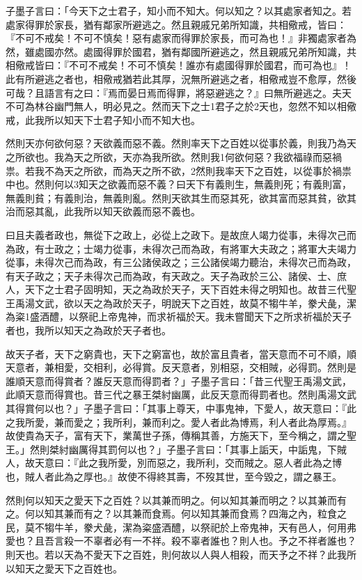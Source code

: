 
\begin{pinyinscope}
子墨子言曰：「今天下之士君子，知小而不知大。何以知之？以其處家者知之。若處家得罪於家長，猶有鄰家所避逃之。然且親戚兄弟所知識，共相儆戒，皆曰：『不可不戒矣！不可不慎矣！惡有處家而得罪於家長，而可為也！』非獨處家者為然，雖處國亦然。處國得罪於國君，猶有鄰國所避逃之，然且親戚兄弟所知識，共相儆戒皆曰：『不可不戒矣！不可不慎矣！誰亦有處國得罪於國君，而可為也』！此有所避逃之者也，相儆戒猶若此其厚，況無所避逃之者，相儆戒豈不愈厚，然後可哉？且語言有之曰：『焉而晏日焉而得罪，將惡避逃之？』曰無所避逃之。夫天不可為林谷幽門無人，明必見之。然而天下之士1君子之於2天也，忽然不知以相儆戒，此我所以知天下士君子知小而不知大也。

然則天亦何欲何惡？天欲義而惡不義。然則率天下之百姓以從事於義，則我乃為天之所欲也。我為天之所欲，天亦為我所欲。然則我1何欲何惡？我欲福祿而惡禍祟。若我不為天之所欲，而為天之所不欲，2然則我率天下之百姓，以從事於禍祟中也。然則何以3知天之欲義而惡不義？曰天下有義則生，無義則死；有義則富，無義則貧；有義則治，無義則亂。然則天欲其生而惡其死，欲其富而惡其貧，欲其治而惡其亂，此我所以知天欲義而惡不義也。

曰且夫義者政也，無從下之政上，必從上之政下。是故庶人竭力從事，未得次己而為政，有士政之；士竭力從事，未得次己而為政，有將軍大夫政之；將軍大夫竭力從事，未得次己而為政，有三公諸侯政之；三公諸侯竭力聽治，未得次己而為政，有天子政之；天子未得次己而為政，有天政之。天子為政於三公、諸侯、士、庶人，天下之士君子固明知，天之為政於天子，天下百姓未得之明知也。故昔三代聖王禹湯文武，欲以天之為政於天子，明說天下之百姓，故莫不犓牛羊，豢犬彘，潔為粢1盛酒醴，以祭祀上帝鬼神，而求祈福於天。我未嘗聞天下之所求祈福於天子者也，我所以知天之為政於天子者也。

故天子者，天下之窮貴也，天下之窮富也，故於富且貴者，當天意而不可不順，順天意者，兼相愛，交相利，必得賞。反天意者，別相惡，交相賊，必得罰。然則是誰順天意而得賞者？誰反天意而得罰者？」子墨子言曰：「昔三代聖王禹湯文武，此順天意而得賞也。昔三代之暴王桀紂幽厲，此反天意而得罰者也。然則禹湯文武其得賞何以也？」子墨子言曰：「其事上尊天，中事鬼神，下愛人，故天意曰：『此之我所愛，兼而愛之；我所利，兼而利之。愛人者此為博焉，利人者此為厚焉。』故使貴為天子，富有天下，業萬世子孫，傳稱其善，方施天下，至今稱之，謂之聖王。」然則桀紂幽厲得其罰何以也？」子墨子言曰：「其事上詬天，中詬鬼，下賊人，故天意曰：『此之我所愛，別而惡之，我所利，交而賊之。惡人者此為之博也，賊人者此為之厚也。』故使不得終其壽，不歿其世，至今毀之，謂之暴王。

然則何以知天之愛天下之百姓？以其兼而明之。何以知其兼而明之？以其兼而有之。何以知其兼而有之？以其兼而食焉。何以知其兼而食焉？四海之內，粒食之民，莫不犓牛羊，豢犬彘，潔為粢盛酒醴，以祭祀於上帝鬼神，天有邑人，何用弗愛也？且吾言殺一不辜者必有一不祥。殺不辜者誰也？則人也。予之不祥者誰也？則天也。若以天為不愛天下之百姓，則何故以人與人相殺，而天予之不祥？此我所以知天之愛天下之百姓也。


\end{pinyinscope}
